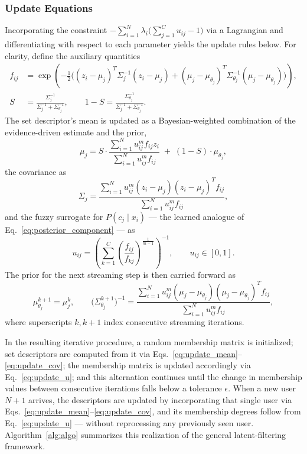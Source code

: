 \documentclass{article}
\begin{document}
\subsubsection{Update Equations}

Incorporating the constraint $-\sum_{i=1}^{N} \lambda_i \big(\sum_{j=1}^{C} u_{ij} - 1\big)$ via a Lagrangian and differentiating with respect to each parameter yields the update rules below. For clarity, define the auxiliary quantities
\begin{align}
	f_{ij} &= \exp\!\left( -\frac{1}{2} \Big( (z_i - \mu_j)^T \Sigma_j^{-1} (z_i - \mu_j) + (\mu_j - \mu_{\theta_j})^T \Sigma_{\theta_j}^{-1} (\mu_j - \mu_{\theta_j}) \Big) \right), \label{eq:aux_f} \\
	S &= \frac{\Sigma_j^{-1}}{\Sigma_j^{-1} + \Sigma_{\theta_j}^{-1}}, \qquad 1 - S = \frac{\Sigma_{\theta_j}^{-1}}{\Sigma_j^{-1} + \Sigma_{\theta_j}^{-1}}. \label{eq:aux_S}
\end{align}
The set descriptor's mean is updated as a Bayesian-weighted combination of the evidence-driven estimate and the prior,
\begin{equation}
	\label{eq:update_mean}
	\mu_j = S \cdot \frac{\sum_{i=1}^{N} u_{ij}^m f_{ij} z_i}{\sum_{i=1}^{N} u_{ij}^m f_{ij}} \;+\; (1 - S) \cdot \mu_{\theta_j},
\end{equation}
the covariance as
\begin{equation}
	\label{eq:update_cov}
	\Sigma_j = \frac{\sum_{i=1}^{N} u_{ij}^m (z_i - \mu_j)(z_i - \mu_j)^T f_{ij}}{\sum_{i=1}^{N} u_{ij}^m f_{ij}},
\end{equation}
and the fuzzy surrogate for $P(c_j \mid x_i)$ — the learned analogue of Eq.~\eqref{eq:posterior_component} — as
\begin{equation}
	\label{eq:update_u}
	u_{ij} = \left( \sum_{k=1}^{C} \left( \frac{f_{ij}}{f_{kj}} \right)^{\frac{1}{m-1}} \right)^{-1}, \qquad u_{ij} \in [0,1].
\end{equation}
The prior for the next streaming step is then carried forward as
\begin{equation}
	\label{eq:update_prior}
	\mu_{\theta_j}^{k+1} = \mu_j^{k}, \qquad \big(\Sigma_{\theta_j}^{k+1}\big)^{-1} = \frac{\sum_{i=1}^{N} u_{ij}^m (\mu_j - \mu_{\theta_j}) (\mu_j - \mu_{\theta_j})^T f_{ij}}{\sum_{i=1}^{N} u_{ij}^m f_{ij}},
\end{equation}
where superscripts $k, k+1$ index consecutive streaming iterations.

In the resulting iterative procedure, a random membership matrix is initialized; set descriptors are computed from it via Eqs.~\eqref{eq:update_mean}--\eqref{eq:update_cov}; the membership matrix is updated accordingly via Eq.~\eqref{eq:update_u}; and this alternation continues until the change in membership values between consecutive iterations falls below a tolerance $\epsilon$. When a new user $N+1$ arrives, the descriptors are updated by incorporating that single user via Eqs.~\eqref{eq:update_mean}--\eqref{eq:update_cov}, and its membership degrees follow from Eq.~\eqref{eq:update_u} — without reprocessing any previously seen user. Algorithm~\ref{alg:algo} summarizes this realization of the general latent-filtering framework.
\end{document}
